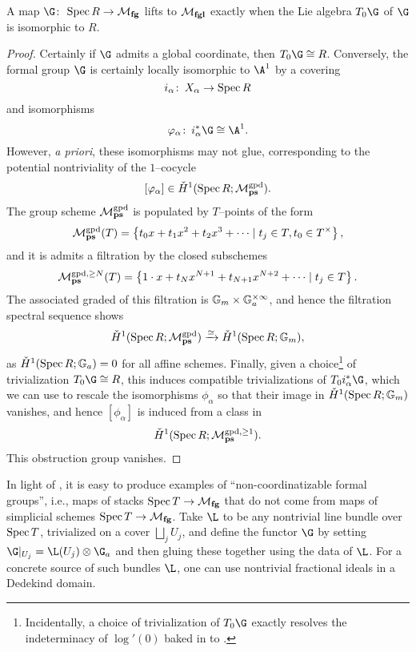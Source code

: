 \begin{lemma}\label{CoordinatizbleFGs}
A map \(\G\co \Spec R \to \moduli{fg}\) lifts to \(\mathcal{M}_{\mathbf{fgl}}\) exactly when the Lie algebra \(T_0 \G\) of \(\G\) is isomorphic to \(R\).
\end{lemma}
\begin{proof}
Certainly if \(\G\) admits a global coordinate, then \(T_0 \G \cong R\).  Conversely, the formal group \(\G\) is certainly locally isomorphic to \(\A^1\) by a covering \[i_\alpha\colon\thinspace X_\alpha \to \operatorname{Spec} R\] and isomorphisms \[\phi_\alpha\co i_\alpha^* \G \cong \A^1.\]  However, \textit{a priori}, these isomorphisms may not glue, corresponding to the potential nontriviality of the {\Cech} \(1\)--cocycle \[[\varphi_\alpha] \in \check{H}^1(\operatorname{Spec} R; \mathcal{M}_{\mathbf{ps}}^{\mathrm{gpd}}).\]  The group scheme \(\mathcal{M}_{\mathbf{ps}}^{\mathrm{gpd}}\) is populated by \(T\)--points of the form \[\mathcal{M}_{\mathbf{ps}}^{\mathrm{gpd}}(T) = \left\{ t_0 x + t_1 x^2 + t_2 x^3 + \cdots \mid t_j \in T, t_0 \in T^\times \right\},\] and it is admits a filtration by the closed subschemes \[\mathcal{M}_{\mathbf{ps}}^{\mathrm{gpd}, \ge N}(T) = \left\{ 1 \cdot x + t_N x^{N+1} + t_{N+1} x^{N+2} + \cdots \mid t_j \in T \right\}.\]  The associated graded of this filtration is \(\mathbb G_m \times \mathbb G_a^{\times \infty}\), and hence the filtration spectral sequence shows \[\check{H}^1(\operatorname{Spec} R; \mathcal{M}_{\mathbf{ps}}^{\mathrm{gpd}}) \xrightarrow{\simeq} \check{H}^1(\operatorname{Spec} R; \mathbb G_m),\] as \(\check{H}^1(\operatorname{Spec} R; \mathbb G_a) = 0\) for all affine schemes.  Finally, given a choice\footnote{Incidentally, a choice of trivialization of \(T_0 \G\) exactly resolves the indeterminacy of \(\log'(0)\) baked in to .} of trivialization \(T_0 \G \cong R\), this induces compatible trivializations of \(T_0 i_\alpha^* \G\), which we can use to rescale the isomorphisms \(\phi_\alpha\) so that their image in \(\check{H}^1(\operatorname{Spec} R; \mathbb G_m)\) vanishes, and hence \([\phi_\alpha]\) is induced from a class in \[\check{H}^1(\operatorname{Spec} R; \mathcal{M}_{\mathbf{ps}}^{\mathrm{gpd}, \ge 1}).\]  This obstruction group vanishes.
\end{proof}

\begin{example}
In light of , it is easy to produce examples of ``non-coordinatizable formal groups'', i.e., maps of stacks \(\operatorname{Spec} T \to \mathcal{M}_{\mathbf{fg}}\) that do not come from maps of simplicial schemes \(\operatorname{Spec} T \to \mathcal{M}_{\mathbf{fg}}\).  Take \(\L\) to be any nontrivial line bundle over \(\operatorname{Spec} T\), trivialized on a cover \(\bigsqcup_j U_j\), and define the functor \(\G\) by setting \(\G|_{U_j} = \L(U_j) \otimes \G_a\) and then gluing these together using the data of \(\L\).  For a concrete source of such bundles \(\L\), one can use nontrivial fractional ideals in a Dedekind domain.
\end{example}

